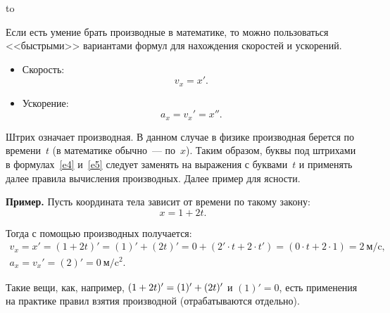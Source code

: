 \documentclass[main.tex]{subfiles}
\begin{document}
\hbox to \textwidth {\hfil\rule{.5\linewidth}{0.4pt}\hfil}

\medskip

Если есть умение брать производные в математике, то можно пользоваться <<быстрыми>> вариантами формул для нахождения скоростей и ускорений.
\begin{itemize}
    \item Скорость:
    \begin{equation}
    \label{e4}
    v_x=x'.
    \end{equation} 
    \item Ускорение:
    \begin{equation}
    \label{e5}
    a_x=v_x'=x''.
    \end{equation}
\end{itemize}

Штрих означает производная. В данном случае в физике производная берется по времени~$t$ (в математике обычно~--- по~$x$). Таким образом, буквы под штрихами в формулах~\eqref{e4} и~\eqref{e5} следует заменять на выражения с буквами~$t$ и применять далее правила вычисления производных. Далее пример для ясности. 


\begin{law}
\noindent\textbf{Пример.} Пусть координата тела зависит от времени по такому закону:
\[
x=1+2t.
\]

Тогда с помощью производных получается:
\begin{gather*}
v_x=x'=(1+2t)'=(1)'+(2t)'=0+(2'\cdot t+2\cdot t')=(0\cdot t+2\cdot 1)=2\ \text{м$/$c},\\
a_x=v_x'=(2)'=0\ \text{м$/$c$^2$}.
\end{gather*}
\end{law}

Такие вещи, как, например, $(1+2t)'=(1)'\hm+(2t)'$ и $(1)'=0$, есть применения на практике правил взятия производной (отрабатываются отдельно).  












 
\end{document}
